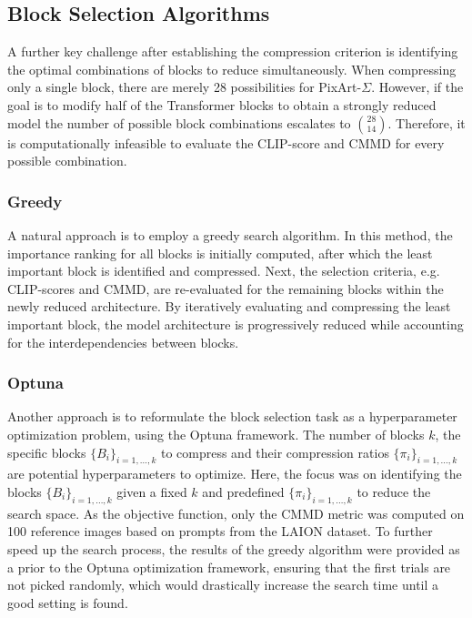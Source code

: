 \newpage
\subsection{Block Selection Algorithms}
\label{sec:PixartBlockSelectionAlgorithms}
A further key challenge after establishing the compression criterion is identifying the optimal combinations of blocks to reduce simultaneously. When compressing only a single block, there are merely 28 possibilities for PixArt-$\Sigma$. However, if the goal is to modify half of the Transformer blocks to obtain a strongly reduced model the number of possible block combinations escalates to $\binom{28}{14}$. Therefore, it is computationally infeasible to evaluate the \gls{CLIP}-score and \gls{CMMD} for every possible combination.

\subsubsection{Greedy}
A natural approach is to employ a greedy search algorithm. In this method, the importance ranking for all blocks is initially computed, after which the least important block is identified and compressed. Next, the selection criteria, e.g. \gls{CLIP}-scores and \gls{CMMD}, are re-evaluated for the remaining blocks within the newly reduced architecture. By iteratively evaluating and compressing the least important block, the model architecture is progressively reduced while accounting for the interdependencies between blocks. 

\subsubsection{Optuna}
Another approach is to reformulate the block selection task as a hyperparameter optimization problem, using the Optuna framework. The number of blocks $k$, the specific blocks $\{B_i\}_{i=1,\dots,k}$ to compress and their compression ratios $\{ \pi_i \}_{i=1,\dots,k}$ are potential hyperparameters to optimize. Here, the focus was on identifying the blocks $\{B_i\}_{i=1,\dots,k}$ given a fixed $k$ and  predefined $\{ \pi_i \}_{i=1,\dots,k}$ to reduce the search space. As the objective function, only the \gls{CMMD} metric was computed on 100 reference images based on prompts from the LAION dataset. To further speed up the search process, the results of the greedy algorithm were provided as a prior to the Optuna optimization framework, ensuring that the first trials are not picked randomly, which would drastically increase the search time until a good setting is found. 

